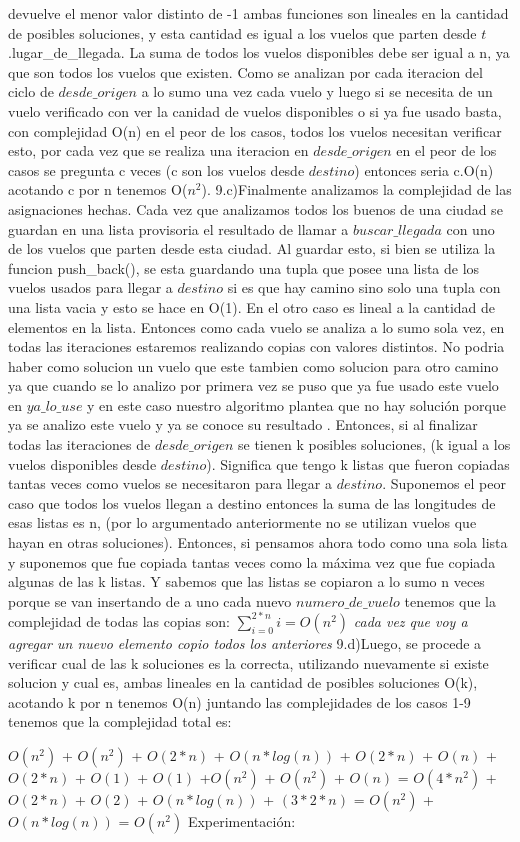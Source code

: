 \documentclass{article}
\begin{document}
devuelve el menor valor distinto de -1 ambas funciones son lineales en la cantidad de posibles soluciones, y esta cantidad es igual a los vuelos que parten desde $t$.lugar\_de\_llegada. La suma de todos los vuelos disponibles debe ser igual a n, ya que son todos los vuelos que existen. Como se analizan por cada iteracion del ciclo de $desde\_origen$ a lo sumo una vez cada vuelo y luego si se necesita de un vuelo verificado con ver la canidad de vuelos disponibles o si ya fue usado basta, con complejidad O(n) en el peor de los casos, todos los vuelos necesitan verificar esto, por cada vez que se realiza una iteracion en  $desde\_origen$ en el peor de los casos se pregunta c veces (c son los vuelos desde $destino$) entonces seria c.O(n) acotando c por n tenemos O($n^{2}$). \newline
9.c)Finalmente analizamos la complejidad de las asignaciones hechas. Cada vez que analizamos todos los buenos de una ciudad se guardan en una lista provisoria el resultado de llamar a $buscar\_llegada$ con uno de los vuelos que parten desde esta ciudad. Al guardar esto, si bien se utiliza la funcion push\_back(), se esta guardando una tupla que posee una lista de los vuelos usados para llegar a $destino$ si es que hay camino sino solo una tupla con una lista vacia y esto se hace en O(1). En el otro caso es lineal a la cantidad de elementos en la lista. Entonces como cada vuelo se analiza a lo sumo sola vez, en todas las iteraciones estaremos realizando copias con valores distintos. No podria haber como solucion un vuelo que este tambien como solucion para otro camino ya que cuando se lo analizo por primera vez se puso que ya fue usado este vuelo en $ya\_lo\_use$ y en este caso nuestro algoritmo plantea que no hay solución porque ya se analizo este vuelo y ya se conoce su resultado . Entonces, si al finalizar todas las iteraciones de $desde\_origen$ se tienen k posibles soluciones, (k igual a los vuelos disponibles desde $destino$). Significa que tengo k listas que fueron copiadas tantas veces como vuelos se necesitaron para llegar a $destino$. Suponemos el peor caso que todos los vuelos llegan a destino entonces la suma de las longitudes de esas listas es n, (por lo argumentado anteriormente no se utilizan vuelos que hayan en otras soluciones). Entonces, si pensamos ahora todo como una sola lista y suponemos que fue copiada tantas veces como la máxima vez que fue copiada algunas de las k listas. Y sabemos que las listas se copiaron a lo sumo n veces porque se van insertando de a uno cada nuevo $numero\_de\_vuelo$ 
tenemos que la complejidad de todas las copias son:\newline
$\sum_{i=0}^{2*n}{i}= O(n^{2})$\newline
\textit{cada vez que voy a agregar un nuevo elemento copio todos los anteriores}\newline
9.d)Luego, se procede a verificar cual de las k soluciones es la correcta, utilizando nuevamente si existe solucion y cual es, ambas lineales en la cantidad de posibles soluciones O(k), acotando k por n tenemos O(n)\newline
juntando las complejidades de los casos 1-9 tenemos que la complejidad total es:     

$O(n^{2})$ + $O(n^{2})$ + $O(2*n)$ + $O(n*log(n))$ + $O(2*n)$ + $O(n)$ + $O(2*n)$ + $O(1)$ + $O(1)$ +$O(n^{2})$ + $O(n^{2})$ + $O(n)$  = $O(4*n^{2})$ + $O(2*n)$ + $O(2)$ + $O(n*log(n))$ + $(3*2*n)$ = $O(n^{2})$ + $O(n*log(n))$ =  $O(n^{2})$
\newline\newline
{\noindent \Huge Experimentaci\'on:}
\end{document}
